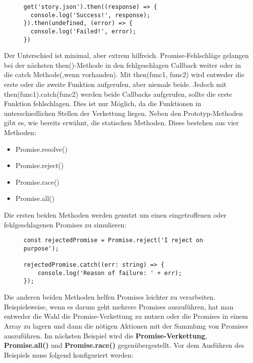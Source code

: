 \begin{figure}[H]
\begin{lstlisting}[basicstyle=\small]
get('story.json').then((response) => {
  console.log('Success!', response);
}).then(undefined, (error) => {
  console.log('Failed!', error);
})
\end{lstlisting}
\end{figure}

\noindent
Der Unterschied ist minimal, aber extrem hilfreich. Promise-Fehlschläge gelangen bei der nächsten then()-Methode in den fehlgeschlagen Callback weiter oder in die catch Methode(,wenn vorhanden). Mit then(func1, func2) wird entweder die erste oder die zweite Funktion aufgerufen, aber niemals beide. Jedoch mit then(func1).catch(func2) werden beide Callbacks aufgerufen, sollte die erste Funktion fehlschlagen. Dies ist nur Möglich, da die Funktionen in unterschiedlichen Stellen der Verkettung liegen. Neben den Prototyp-Methoden gibt es, wie bereits erwähnt, die statischen Methoden. Diese bestehen aus vier Methoden:

\begin{itemize}
\item Promise.resolve()
\item Promise.reject()
\item Promise.race()
\item Promise.all()
\end{itemize}

\noindent
Die ersten beiden Methoden werden genutzt um einen eingetroffenen oder fehlgeschlagenen Promises zu simulieren:

\begin{figure}[H]
\begin{lstlisting}[basicstyle=\small]
const rejectedPromise = Promise.reject('I reject on purpose');

rejectedPromise.catch((err: string) => {
    console.log('Reason of failure: ' + err);
});
\end{lstlisting}
\end{figure}

\noindent
Die anderen beiden Methoden helfen Promises leichter zu verarbeiten. Beispielsweise, wenn es darum geht mehrere Promises auszuführen, hat man entweder die Wahl die Promise-Verkettung zu nutzen oder die Promises in einem Array zu lagern und dann die nötigen Aktionen mit der Sammlung von Promises auszuführen. Im nächsten Beispiel wird die \textbf{Promise-Verkettung}, \textbf{Promise.all()} und \textbf{Promise.race()} gegenübergestellt. Vor dem Ausführen des Beispiels muss folgend konfiguriert werden:

